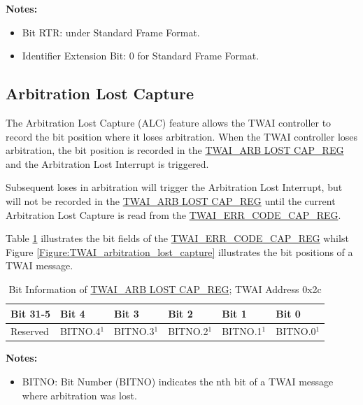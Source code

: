 \documentclass[main\_\_EN.tex]{subfiles}
\begin{document}
\vspace{-1.5em}
{\bfseries Notes:}\\
\begin{itemize}
    \item Bit RTR: under Standard Frame Format.
    \item Identifier Extension Bit: 0 for Standard Frame Format.
\end{itemize}

\subsection{Arbitration Lost Capture}

The Arbitration Lost Capture (ALC) feature allows the TWAI controller to record the bit position where it loses arbitration. When the TWAI controller loses arbitration, the bit position is recorded in the \hyperref[regdesc:TWAIARB LOST CAPREG]{TWAI\_ARB LOST CAP\_REG} and the Arbitration Lost Interrupt is triggered.

Subsequent loses in arbitration will trigger the Arbitration Lost Interrupt, but will not be recorded in the \hyperref[regdesc:TWAIARB LOST CAPREG]{TWAI\_ARB LOST CAP\_REG} until the current Arbitration Lost Capture is read from the \hyperref[regdesc:TWAIERRCODECAPREG]{TWAI\_ERR\_CODE\_CAP\_REG}.

Table \ref{table:ALC_REG} illustrates the bit fields of the \hyperref[regdesc:TWAIERRCODECAPREG]{TWAI\_ERR\_CODE\_CAP\_REG} whilst Figure \ref{Figure:TWAI_arbitration_lost_capture} illustrates the bit positions of a TWAI message.

\begin{longtable}[c]{|p{2.3cm}|p{2.3cm}|p{2.3cm}|p{2.3cm}|p{2.3cm}|p{2.3cm}|}
    \caption{Bit Information of \hyperref[regdesc:TWAIARB LOST CAPREG]{TWAI\_ARB LOST CAP\_REG}; TWAI Address 0x2c}
    \label{table:ALC_REG}
    \\\hline
    \rowcolor{lightgray}
  Bit 31-5 & Bit 4 & Bit 3 & Bit 2 & Bit 1 & Bit 0\\ \hline
   Reserved & BITNO.4$^1$ & BITNO.3$^1$ & BITNO.2$^1$ & BITNO.1$^1$ & BITNO.0$^1$\\\hline
\end{longtable}
\vspace{-1.5em}
{\bfseries Notes: }\\
\begin{itemize}
    \item BITNO: Bit Number (BITNO) indicates the nth bit of a TWAI message where arbitration was lost.
\end{itemize}
\end{document}
